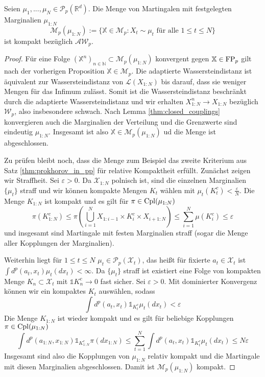 \begin{corollary}
    Seien $\mu_1,...,\mu_N \in \mathcal{P}_p(\mathbb{R}^d)$. Die Menge von Martingalen mit festgelegten Marginalien $\mu_{1:N}$
    $$\mathcal{M}_p(\mu_{1:N}) := \{ \mathbb{X} \in \mathcal{M}_p: X_t \sim \mu_t \text{ für alle } 1\leq t \leq N\}$$
    ist kompakt bezüglich $\mathcal{AW}_p$.
\end{corollary}
\begin{proof}
    Für eine Folge $(\mathbb{X}^n)_{n\in \mathbb{N}} \subset \mathcal{M}_p(\mu_{1:N})$ konvergent gegen $\mathbb{X} \in \operatorname{FP}_p$ gilt nach der vorherigen Proposition $\mathbb{X} \in \mathcal{M}_p$. Die adaptierte Wassersteindistanz ist äquivalent zur Wassersteindistanz von $\mathcal{L}(X_{1:N})$ bis darauf, dass sie weniger Mengen für das Infimum zulässt. Somit ist die Wassersteindistanz beschränkt durch die adaptierte Wassersteindistanz und wir erhalten $X^n_{1:N} \rightarrow X_{1:N}$ bezüglich $\mathcal{W}_p$, also insbesondere schwach. Nach Lemma \ref{thm:closed_couplings} konvergieren auch die Marginalien der Verteilung und die Grenzwerte sind eindeutig $\mu_{1:N}$. Insgesamt ist also $\mathbb{X} \in \mathcal{M}_p(\mu_{1:N})$ ud die Menge ist abgeschlossen.

    Zu prüfen bleibt noch, dass die Menge zum Beispiel das zweite Kriterium aus Satz \ref{thm:prokhorov_in_pp} für relative Kompaktheit erfüllt. Zunächst zeigen wir Straffheit. Sei $\varepsilon>0$. Da $\mathcal{X}_{1:N}$ polnisch ist, sind die einzelnen Marginalien $\{\mu_t\}$ straff und wir können kompakte Mengen $K_t$ wählen mit $\mu_t(K_t^c) < \frac{\varepsilon}{N}$. Die Menge $K_{1:N}$ ist kompakt und es gilt für $\pi \in \operatorname{Cpl}(\mu_{1:N})$ 
    $$\pi(K_{1:N}^c) \leq \pi\left( \bigcup_{i=1}^N X_{1:i-1} \times K_i^c \times X_{i+1:N}\right) \leq \sum_{i=1}^N \mu(K_i^c) \leq \varepsilon$$
    und insgesamt sind Martingale mit festen Marginalien straff (sogar die Menge aller Kopplungen der Marginalien). 

    Weiterhin liegt für $1\leq t \leq N$ $\mu_t \in \mathcal{P}_p(\mathcal{X}_t)$, das heißt für fixierte $a_t \in \mathcal{X}_t$ ist $\int d^p(a_t, x_t) \mu_t(dx_t) < \infty$. Da $\{\mu_t\}$ straff ist existiert eine Folge von kompakten Menge $K_n \subset \mathcal{X}_t$ mit $\mathds{1}{K_n^c} \rightarrow 0$ fast sicher. Sei $\varepsilon>0$. Mit dominierter Konvergenz können wir ein kompaktes $K_t$ auswählen, sodass
    $$\int d^p(a_t, x_t) \mathds{1}_{K_t^c} \mu_t(dx_t) < \varepsilon$$
    Die Menge $K_{1:N}$ ist wieder kompakt und es gilt für beliebige Kopplungen $\pi \in \operatorname{Cpl}(\mu_{1:N})$
    $$\int d^p(a_{1:N}, x_{1:N}) \mathds{1}_{K_{1:N}^c} \pi(dx_{1:N}) \leq \sum_{t=1}^N \int d^p(a_t, x_t) \mathds{1}_{K_t^c} \mu_t(dx_t) \leq N\varepsilon$$
    Insgesamt sind also die Kopplungen von $\mu_{1:N}$ relativ kompakt und die Martingale mit diesen Marginalien abgeschlossen. Damit ist $\mathcal{M}_p(\mu_{1:N})$ kompakt.
\end{proof}


